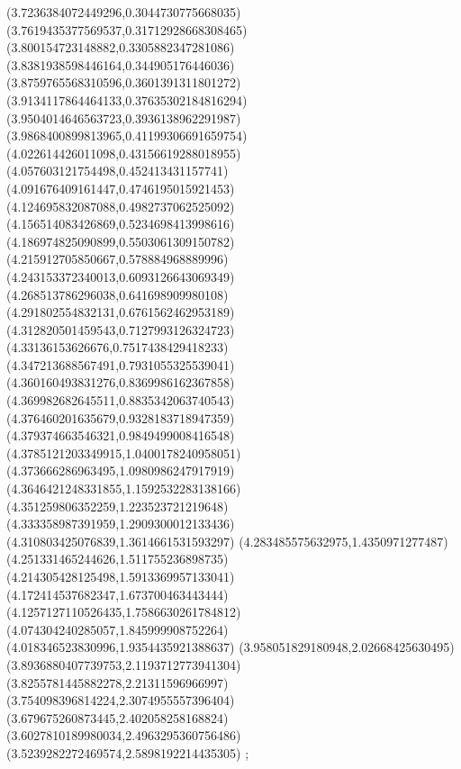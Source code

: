 {(3.7236384072449296,0.3044730775668035)
(3.7619435377569537,0.31712928668308465)
(3.800154723148882,0.3305882347281086)
(3.8381938598446164,0.344905176446036)
(3.8759765568310596,0.3601391311801272)
(3.9134117864464133,0.37635302184816294)
(3.9504014646563723,0.3936138962291987)
(3.9868400899813965,0.41199306691659754)
(4.022614426011098,0.43156619288018955)
(4.057603121754498,0.452413431157741)
(4.091676409161447,0.4746195015921453)
(4.124695832087088,0.4982737062525092)
(4.156514083426869,0.5234698413998616)
(4.186974825090899,0.5503061309150782)
(4.215912705850667,0.578884968889996)
(4.243153372340013,0.6093126643069349)
(4.268513786296038,0.641698909980108)
(4.291802554832131,0.6761562462953189)
(4.312820501459543,0.7127993126324723)
(4.33136153626676,0.7517438429418233)
(4.347213688567491,0.7931055325539041)
(4.360160493831276,0.8369986162367858)
(4.369982682645511,0.8835342063740543)
(4.376460201635679,0.9328183718947359)
(4.379374663546321,0.9849499008416548)
(4.3785121203349915,1.0400178240958051)
(4.373666286963495,1.0980986247917919)
(4.3646421248331855,1.1592532283138166)
(4.351259806352259,1.223523721219648)
(4.333358987391959,1.2909300012133436)
(4.310803425076839,1.3614661531593297)
(4.283485575632975,1.4350971277487)
(4.251331465244626,1.511755236898735)
(4.214305428125498,1.5913369957133041)
(4.172414537682347,1.673700463443444)
(4.1257127110526435,1.7586630261784812)
(4.074304240285057,1.845999908752264)
(4.018346523830996,1.9354435921388637)
(3.958051829180948,2.02668425630495)
(3.8936880407739753,2.1193712773941304)
(3.8255781445882278,2.21311596966997)
(3.754098396814224,2.3074955557396404)
(3.679675260873445,2.402058258168824)
(3.6027810189980034,2.4963295360756486)
(3.5239282272469574,2.5898192214435305)
};
